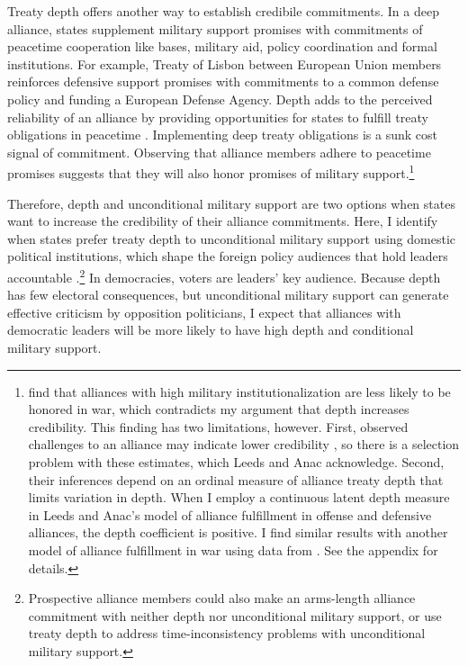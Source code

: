 \documentclass[12pt]{article}
\begin{document}
Treaty depth offers another way to establish credibile commitments.
In a deep alliance, states supplement military support promises with commitments of peacetime cooperation like bases, military aid, policy coordination and formal institutions. 
For example, Treaty of Lisbon between European Union members reinforces defensive support promises with commitments to a common defense policy and funding a European Defense Agency. 
Depth adds to the perceived reliability of an alliance by providing opportunities for states to fulfill treaty obligations in peacetime \citep{Morrow1994}. 
Implementing deep treaty obligations is a sunk cost signal of commitment.
Observing that alliance members adhere to peacetime promises suggests that they will also honor promises of military support.\footnote{\citet{LeedsAnac2005} find that alliances with high military institutionalization are less likely to be honored in war, which contradicts my argument that depth increases credibility. 
This finding has two limitations, however. 
First, observed challenges to an alliance may indicate lower credibility \citep{Smith1995}, so there is a selection problem with these estimates, which Leeds and Anac acknowledge. 
Second, their inferences depend on an ordinal measure of alliance treaty depth that limits variation in depth. 
When I employ a continuous latent depth measure in Leeds and Anac's model of alliance fulfillment in offense and defensive alliances, the depth coefficient is positive. 
I find similar results with another model of alliance fulfillment in war using data from \citet{BerkemeierFuhrmann2018}.
See the appendix for details.} 


Therefore, depth and unconditional military support are two options when states want to increase the credibility of their alliance commitments.
Here, I identify when states prefer treaty depth to unconditional military support using domestic political institutions, which shape the foreign policy audiences that hold leaders accountable \citep{HydeSaunders2020}.\footnote{Prospective alliance members could also make an arms-length alliance commitment with neither depth nor unconditional military support, or use treaty depth to address time-inconsistency problems with unconditional military support.} 
In democracies, voters are leaders' key audience.  
Because depth has few electoral consequences, but unconditional military support can generate effective criticism by opposition politicians, I expect that alliances with democratic leaders will be more likely to have high depth and conditional military support. 
\end{document}
